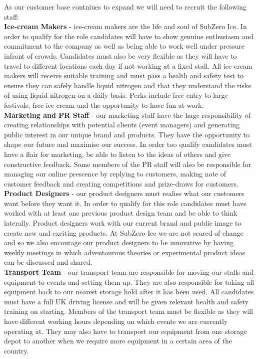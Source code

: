 \documentclass{article}
\begin{document}
  As our customer base contniues to expand we will need to recruit the following staff: \\

  {\bf Ice-cream Makers} - ice-cream makers are the life and soul of SubZero Ice. In order to qualify for the role candidates will have to show genuine enthusiasm and commitment to the company as well as being able to work well under pressure infront of crowds. Candidates must also be very flexible as they will have to travel to different locations each day if not working at a fixed stall. All ice-cream makers will receive suitable training and must pass a health and safety test to ensure they can safely handle liquid nitrogen and that they understand the risks of using liquid nitrogen on a daily basis. Perks include free entry to large festivals, free ice-cream and the opportunity to have fun at work. \\

  {\bf Marketing and PR Staff} - our marketing staff have the huge responsibility of creating relationships with potential clients (event managers) and generating public interest in our unique brand and products. They have the opportunity to shape our future and maximise our success. In order too qualify candidates must have a flair for marketing, be able to listen to the ideas of others and give constructive feedback. Some members of the PR staff will also be responsible for managing our online prescence by replying to customers, making note of customer feedback and creating competitions and prize-draws for customers. \\

  {\bf Product Designers} - our product designers must realise what our customers want before they want it. In order to qualify for this role candidates must have worked with at least one previous product design team and be able to think laterally. Product designers work with our current brand and public image to create new and exciting products. At SubZero Ice we are not scared of change and so we also encourage our product designers to be innovative by having weekly meetings in which adventourous theories or experimental product ideas can be discussed and shared. \\

  {\bf Transport Team} - our transport team are responsible for moving our stalls and equipment to events and setting them up. They are also responsible for taking all equipment back to our nearest storage hold after it has been used. All candidates must have a full UK driving license and will be given relevant health and safety training on starting. Members of the transport team must be flexible as they will have different working hours depending on which events we are currently operating at. They may also have to transport our equipment from one storage depot to another when we require more equipment in a certain area of the country. \\
\end{document}
